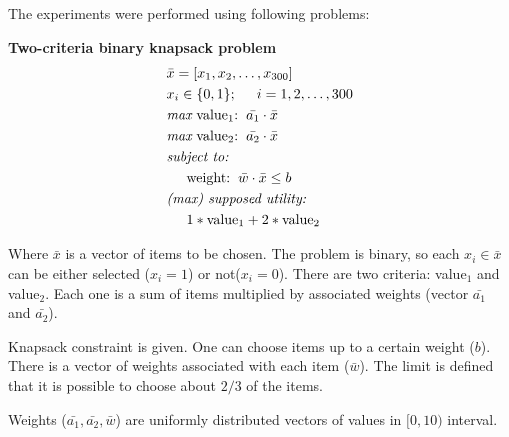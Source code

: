 The experiments were performed using following problems:
\begin{description}
  \item{\textbf{Two-criteria binary knapsack problem}}
    \begin{align*}
      & \bar{x} = [x_1, x_2, \dots, x_{300}]  \\
      & x_i \in \{0, 1\};  \hspace{0.5cm} i = 1, 2, \dots, 300 \\
      & \textit{max}\text{ value$_1$:} \hspace{0.2cm} \bar{a_1} \cdot \bar{x} \\
      & \textit{max}\text{ value$_2$:} \hspace{0.2cm} \bar{a_2} \cdot \bar{x} \\
      & \textit{subject to:} \\
      & \hspace{0.5cm} \text{weight:} \hspace{0.2cm} \bar{w} \cdot \bar{x}
      \leq b \\
      & \textit{(max) supposed utility:} \\
      & \hspace{0.5cm} 1*\text{value}_1 + 2*\text{value}_2
    \end{align*}
    
    Where $\bar{x}$ is a vector of items to be chosen. The problem is binary,
    so each $x_i \in \bar{x}$ can be either selected ($x_i = 1$) or not($x_i
    = 0$). There are two criteria: value$_1$ and value$_2$. Each one is a sum
    of items multiplied by associated weights (vector $\bar{a_1}$ and
    $\bar{a_2}$).

    Knapsack constraint is given. One can choose items up to a certain weight
    ($b$). There is a vector of weights associated with each item
    ($\bar{w}$). The limit is defined that it is possible to choose about
    $2/3$ of the items.

    Weights ($\bar{a_1}, \bar{a_2}, \bar{w}$) are uniformly distributed
    vectors of values in $[0,10)$ interval.



\end{description}
